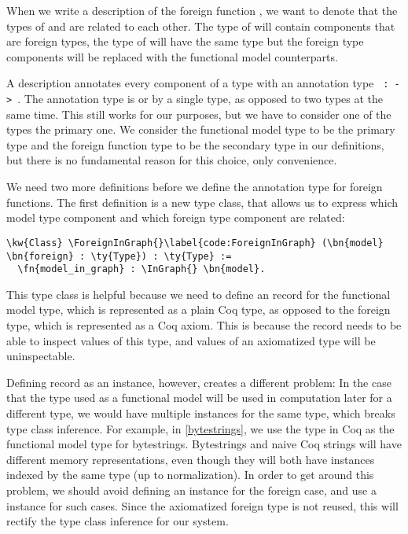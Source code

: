 When we write a \reified{} description of the \gls{foreign function} , we want to denote that the types of  and  are related to each other. The type of  will contain components that are \gls{foreign type}s, the type of  will have the same type but the \gls{foreign type} components will be replaced with the \gls{functional model} counterparts.

A \reified{} description annotates every component of a type with an annotation type \texttt{ :  -> }. The annotation type is  or  by a single type, as opposed to two types at the same time. This still works for our purposes, but we have to consider one of the types the primary one. We consider the \gls{functional model} type to be the primary type and the \gls{foreign function} type to be the secondary type in our definitions, but there is no fundamental reason for this choice, only convenience.

We need two more definitions before we define the annotation type for foreign functions. The first definition is a new type class, that allows us to express which model type component and which foreign type component are related:
\newpage
\newcommand{\ForeignInGraph}{\hyperref[code:ForeignInGraph]{\ty{ForeignInGraph}}}
\begin{Verbatim}
\kw{Class} \ForeignInGraph{}\label{code:ForeignInGraph} (\bn{model} \bn{foreign} : \ty{Type}) : \ty{Type} :=
  \fn{model_in_graph} : \InGraph{} \bn{model}.
\end{Verbatim}

This type class is helpful because we need to define an \InGraph{} record for the \gls{functional model} type, which is represented as a plain Coq type, as opposed to the \gls{foreign type}, which is represented as a Coq axiom. This is because the \InGraph{} record needs to be able to inspect values of this type, and values of an axiomatized type will be uninspectable.

Defining \InGraph{} record as an instance, however, creates a different problem: In the case that the type used as a \gls{functional model} will be used in computation later for a different type, we would have multiple \InGraph{} instances for the same type, which breaks type class inference. For example, in \autoref{bytestrings}, we use the  type in Coq as the \gls{functional model} type for bytestrings. Bytestrings and naive Coq strings will have different memory representations, even though they will both have \InGraph{} instances indexed by the same type (up to normalization). In order to get around this problem, we should avoid defining an \InGraph{} instance for the foreign case, and use a \ForeignInGraph{} instance for such cases. Since the axiomatized \gls{foreign type} is not reused, this will rectify the type class inference for our system.

